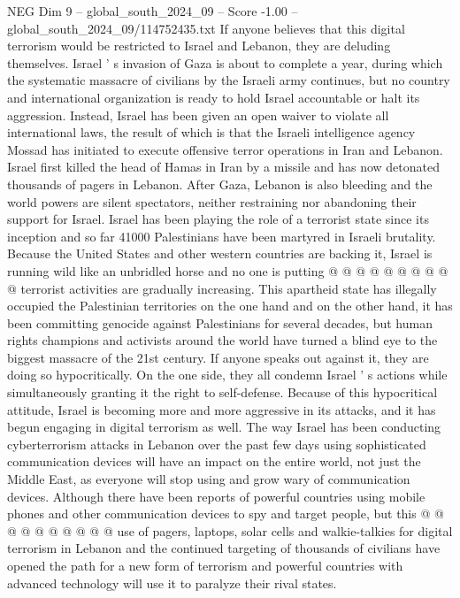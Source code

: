 \begin{textsample}{NEG Dim 9 – global\_south\_2024\_09 – Score -1.00 – global\_south\_2024\_09/114752435.txt}  \label{ex:f9_neg_205}
If anyone believes that this digital terrorism would be restricted to Israel and Lebanon, they are deluding themselves.
Israel ' s invasion of Gaza is about to complete a year, during which the systematic massacre of civilians by the Israeli army continues, but no country and international organization is ready to hold Israel accountable or halt its aggression.
Instead, Israel has been given an open waiver to violate all international laws, the result of which is that the Israeli intelligence agency Mossad has initiated to execute offensive terror operations in Iran and Lebanon.
Israel first killed the head of Hamas in Iran by a missile and has now detonated thousands of pagers in Lebanon.
After Gaza, Lebanon is also bleeding and the world powers are silent spectators, neither restraining nor abandoning their support for Israel.
Israel has been playing the role of a terrorist state since its inception and so far 41000 Palestinians have been martyred in Israeli brutality.
Because the United States and other western countries are backing it, Israel is running wild like an unbridled horse and no one is putting @ @ @ @ @ @ @ @ @ @ terrorist activities are gradually increasing.
This apartheid state has illegally occupied the Palestinian territories on the one hand and on the other hand, it has been committing genocide against Palestinians for several decades, but human rights champions and activists around the world have turned a blind eye to the biggest massacre of the 21st century.
If anyone speaks out against it, they are doing so hypocritically.
On the one side, they all condemn Israel ' s actions while simultaneously granting it the right to self-defense.
Because of this hypocritical attitude, Israel is becoming more and more aggressive in its attacks, and it has begun engaging in digital terrorism as well.
The way Israel has been conducting cyberterrorism attacks in Lebanon over the past few days using sophisticated communication devices will have an impact on the entire world, not just the Middle East, as everyone will stop using and grow wary of communication devices.
Although there have been reports of powerful countries using mobile phones and other communication devices to spy and target people, but this @ @ @ @ @ @ @ @ @ @ use of pagers, laptops, solar cells and walkie-talkies for digital terrorism in Lebanon and the continued targeting of thousands of civilians have opened the path for a new form of terrorism and powerful countries with advanced technology will use it to paralyze their rival states.

\end{textsample}
